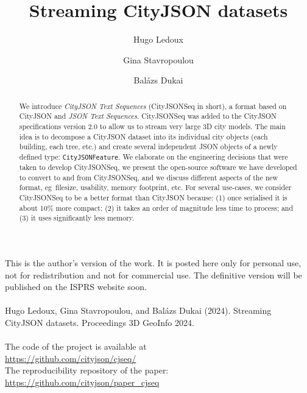 \documentclass[11pt,halfparskip,parskip=half]{scrartcl}
\newcommand{\eg}{eg}
\begin{document}
\title{Streaming CityJSON datasets}


\author{Hugo Ledoux \and Gina Stavropoulou \and Balázs Dukai}

\date{}
\maketitle

\begin{myframe}
This is the author's version of the work.
It is posted here only for personal use, not for redistribution and not for commercial use.
The definitive version will be published on the ISPRS website soon.
\\
\\
Hugo Ledoux, Gina Stavropoulou, and Balázs Dukai (2024). Streaming CityJSON datasets. Proceedings 3D GeoInfo 2024.
\\
\\
The code of the project is available at
\\
\url{https://github.com/cityjson/cjseq/}
\\
The reproducibility repository of the paper:
\\
\url{https://github.com/cityjson/paper_cjseq}
\end{myframe}

\begin{abstract}
We introduce \emph{CityJSON Text Sequences} (CityJSONSeq in short), a format based on CityJSON and \emph{JSON Text Sequences}.
CityJSONSeq was added to the CityJSON specifications version 2.0 to allow us to stream very large 3D city models.
The main idea is to decompose a CityJSON dataset into its individual city objects (each building, each tree, etc.) and create several independent JSON objects of a newly defined type: \texttt{CityJSONFeature}.
We elaborate on the engineering decisions that were taken to develop CityJSONSeq, we present the open-source software we have developed to convert to and from CityJSONSeq, and we discuss different aspects of the new format, \eg\ filesize, usability, memory footprint, etc.
For several use-cases, we consider CityJSONSeq to be a better format than CityJSON because: (1) once serialised it is about 10\% more compact; (2) it takes an order of magnitude less time to process; and (3) it uses significantly less memory.
\end{abstract}
\end{document}
